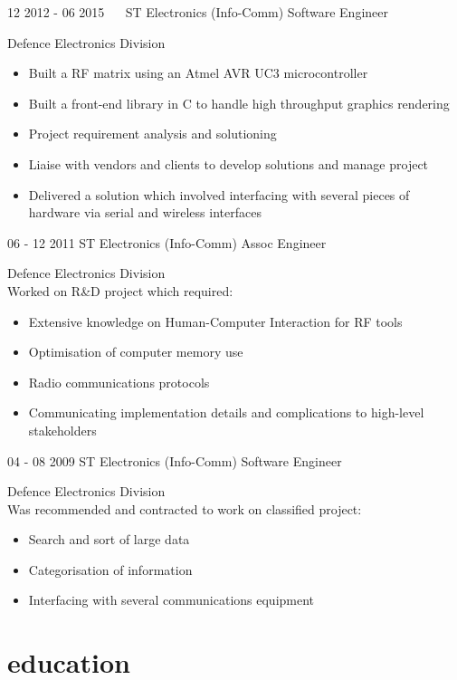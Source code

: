 \documentclass[]{friggeri-cv}
\begin{document}
\begin{entrylist}
	\entry
	{12 2012 - 06 2015   \ \ }
	{ST Electronics (Info-Comm)}
	{Software Engineer}
	{Defence Electronics Division
	\begin{itemize}[itemsep=0pt,topsep=0pt]
	\item Built a RF matrix using an Atmel AVR UC3 microcontroller
	\item Built a front-end library in C to handle high throughput graphics rendering
	\item Project requirement analysis and solutioning
	\item Liaise with vendors and clients to develop solutions and manage project
	\item Delivered a solution which involved interfacing with several pieces of hardware via serial and wireless interfaces
	\end{itemize}}
	
	\entry
	{06 - 12 2011 }
	{ST Electronics (Info-Comm)}
	{Assoc Engineer}
	{Defence Electronics Division \\Worked on R\&D project which required:
	\begin{itemize}[itemsep=0pt,topsep=0pt]
	\item Extensive knowledge on Human-Computer Interaction for RF tools
	\item Optimisation of computer memory use
	\item Radio communications protocols
	\item Communicating implementation details and complications to high-level stakeholders
	\end{itemize}}
	
	\entry
	{04 - 08 2009}
	{ST Electronics (Info-Comm)}
	{Software Engineer}
	{Defence Electronics Division \\Was recommended and contracted to work on classified project:
	\begin{itemize}[itemsep=0pt,topsep=0pt]
	\item Search and sort of large data
	\item Categorisation of information
	\item Interfacing with several communications equipment
	\end{itemize}}
\end{entrylist}

\section{education}
\end{document}

